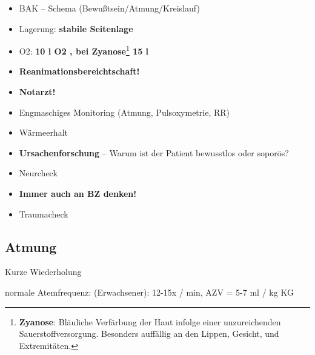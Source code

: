 \documentclass{article}
\newcommand\gEs[1]{\textbf{\textcolor[rgb]{0.0,0.0,0.5019608}{#1}}}
\newcommand\gEs[1]{\textbf{\textcolor[rgb]{0.0,0.0,0.5019608}{#1}}}
\newcommand\gT[1]{\textbf{\textup{\textcolor[rgb]{0.0,0.5019608,0.0}{#1}}}}
\begin{document}
\begin{itemize}
\item {\mdseries\color[rgb]{0.0,0.0,0.5019608}
BAK -- Schema  (Bewu{\ss}tsein/Atmung/Kreislauf)}

\item {\mdseries\color[rgb]{0.0,0.0,0.5019608}
Lagerung: \gEs{stabile Seitenlage}}

\item {\mdseries\color[rgb]{0.0,0.0,0.5019608}
O2:  \gEs{10 l  O2 , bei
Zyanose}\footnote{\gT{Zyanose}: Bl\"auliche Verf\"arbung
der Haut infolge einer unzureichenden Sauerstoffversorgung. Besonders
auff\"allig an den Lippen, Gesicht, und
Extremit\"aten.}\gEs{  15 l}}

\item {\mdseries\color[rgb]{0.0,0.0,0.5019608}
\gEs{Reanimationsbereichtschaft!}}

\item {\mdseries\color[rgb]{0.0,0.0,0.5019608}
\gEs{Notarzt! }}

\item {\mdseries\color[rgb]{0.0,0.0,0.5019608}
Engmaschiges Monitoring (Atmung, Pulsoxymetrie, RR)}

\item {\mdseries\color[rgb]{0.0,0.0,0.5019608}
W\"armeerhalt}

\item {\mdseries\color[rgb]{0.0,0.0,0.5019608}
\gEs{Ursachenforschung} -- Warum ist der Patient
bewusstlos oder sopor\"os?}

\item {\mdseries\color[rgb]{0.0,0.0,0.5019608}
Neurcheck}

\end{itemize}
\begin{itemize}
\item {\mdseries\color[rgb]{0.0,0.0,0.5019608}
\gEs{Immer auch an BZ denken!}}

\end{itemize}
\begin{itemize}
\item {\mdseries\color[rgb]{0.0,0.0,0.5019608}
Traumacheck}

\end{itemize}
\subsection{Atmung}
{\mdseries\color{black}
Kurze Wiederholung}

{\mdseries
normale Atemfrequenz: (Erwachsener): 12-15x / min, AZV = 5-7 ml / kg KG}
\end{document}
